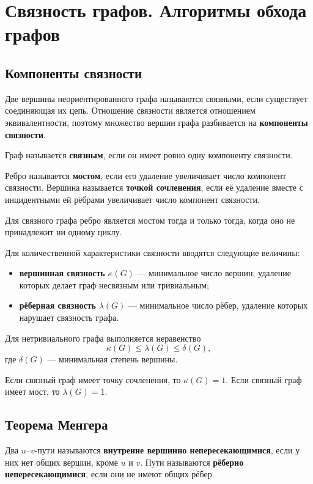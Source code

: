 \section{Связность графов. Алгоритмы обхода графов}
\label{sec:graph-connectivity}

\subsection{Компоненты связности}

Две вершины неориентированного графа называются связными, если существует соединяющая их цепь. Отношение связности является отношением эквивалентности, поэтому множество вершин графа разбивается на \textbf{компоненты связности}.

Граф называется \textbf{связным}, если он имеет ровно одну компоненту связности.

Ребро называется \textbf{мостом}, если его удаление увеличивает число компонент связности. Вершина называется \textbf{точкой сочленения}, если её удаление вместе с инцидентными ей рёбрами увеличивает число компонент связности.

Для связного графа ребро является мостом тогда и только тогда, когда оно не принадлежит ни одному циклу.

Для количественной характеристики связности вводятся следующие величины:
\begin{itemize}
	\item \textbf{вершинная связность} $\kappa(G)$ --- минимальное число вершин, удаление которых делает граф несвязным или тривиальным;
	\item \textbf{рёберная связность} $\lambda(G)$ --- минимальное число рёбер, удаление которых нарушает связность графа.
\end{itemize}

Для нетривиального графа выполняется неравенство
\[
\kappa(G)\leq\lambda(G)\leq\delta(G),
\]
где $\delta(G)$ --- минимальная степень вершины.

Если связный граф имеет точку сочленения, то $\kappa(G)=1$. Если связный граф имеет мост, то $\lambda(G)=1$.

\subsection{Теорема Менгера}

Два $u$--$v$-пути называются \textbf{внутренне вершинно непересекающимися}, если у них нет общих вершин, кроме $u$ и $v$. Пути называются \textbf{рёберно непересекающимися}, если они не имеют общих рёбер.

